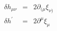 \begin{equation}
  \begin{array}{rcl}
  \delta h_{\mu\nu} &=& 2 \partial_{( \mu} \xi_{\nu )} \\
  \delta h^{\prime} &=& 2 \partial^{\mu} \xi_{\mu} \\
  \end{array}
\label{eq:a3}
\end{equation}


